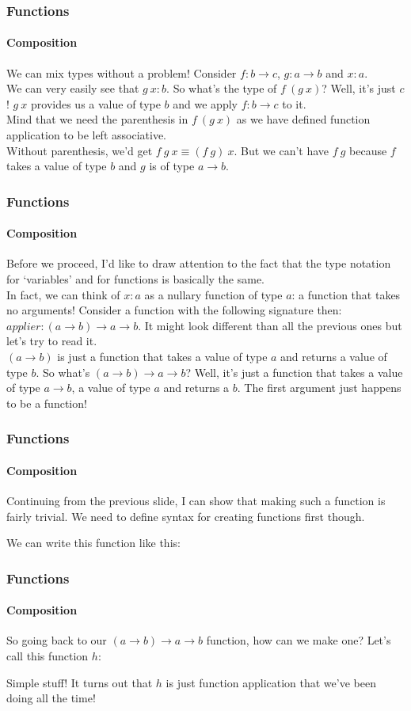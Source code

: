 \documentclass{beamer}
\begin{document}
\begin{frame}
  \frametitle{Functions}
  \framesubtitle{Composition}
  We can mix types without a problem! Consider $f:b \rightarrow c$, $g:a
  \rightarrow b$ and $x:a$.\\
  \pause
  We can very easily see that $g\:x:b$. So what's the type of
  $f\:(g\:x)$? Well, it's just $c$! $g\:x$ provides us a value of type
  $b$ and we apply $f:b \rightarrow c$ to it.\\
  \pause
  Mind that we need the parenthesis in $f\:(g\:x)$ as we have defined
  function application to be left associative.\\
  Without parenthesis, we'd get $f\:g\:x \equiv (f\:g)\:x$. But we
  can't have $f\:g$ because $f$ takes a value of type $b$ and $g$ is
  of type $a \rightarrow b$.\\
\end{frame}
\begin{frame}
  \frametitle{Functions}
  \framesubtitle{Composition}
  Before we proceed, I'd like to draw attention to the fact that the
  type notation for `variables' and for functions is basically the
  same.\\
  \pause
  In fact, we can think of $x:a$ as a nullary function of type $a$: a function that takes
  no arguments! Consider a function with the following signature then:
  $applier:(a \rightarrow b) \rightarrow a \rightarrow b$. It might
  look different than all the previous ones but let's try to read
  it.\\
  \pause
  $(a \rightarrow b)$ is just a function that takes a value of type
  $a$ and returns a value of type $b$. So what's $(a \rightarrow b)
  \rightarrow a \rightarrow b$? Well, it's just a function that takes a value of
  type $a \rightarrow b$, a value of type $a$ and returns a $b$. The
  first argument just happens to be a function!\\
  \pause
\end{frame}
\begin{frame}
  \frametitle{Functions}
  \framesubtitle{Composition}
  Continuing from the previous slide, I can show that making such a
  function is fairly trivial. We need to define syntax for creating
  functions first though.\\
  \pause
  
  We can write this function like this:
  
  \pause
\end{frame}
\begin{frame}
  \frametitle{Functions}
  \framesubtitle{Composition}
  So going back to our $(a \rightarrow b)
  \rightarrow a \rightarrow b$ function, how can we make one? Let's
  call this function $h$:
  
  \pause
  Simple stuff! It turns out that $h$ is just function application
  that we've been doing all the time!
\end{frame}
\end{document}
